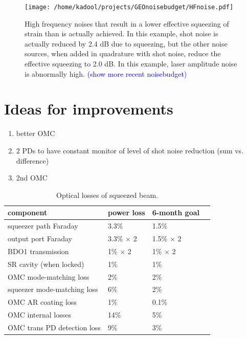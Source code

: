 \documentclass{ligodoc}
\begin{document}
\begin{figure}
\begin{centering}
\texttt{[image: /home/kadool/projects/GEOnoisebudget/HFnoise.pdf]}
\caption{High frequency noises that result in a lower effective
  squeezing of strain than is actually achieved. In this example, shot
  noise is actually reduced by 2.4 dB due to squeezing, but the other
  noise sources, when added in quadrature with shot noise, reduce the
  effective squeezing to 2.0 dB. In this example, laser amplitude
  noise is abnormally high. \textcolor{blue}{(show more recent
    noisebudget)}}
\label{fig:HFnoises}
\end{centering}
\end{figure}


\section{Ideas for improvements}
\label{sec:future}

\begin{enumerate}
\item better OMC
\item 2 PDs to have constant monitor of level of shot noise reduction
  (sum vs. difference)
\item 2nd OMC
\end{enumerate}



\begin{table}
\centering
\caption{Optical losses of squeezed beam.}
\begin{tabular}{l l l l} %
\hline
component & power loss & 6-month goal \\
\hline
squeezer path Faraday & 3.3\% & 1.5\% \\
output port Faraday & 3.3\% $\times$ 2 & 1.5\% $\times$ 2 \\
BDO1 transmission & 1\% $\times$ 2 & 1\% $\times$ 2 \\
SR cavity (when locked) & 1\% & 1\% \\
OMC mode-matching loss & 2\% & 2\% \\
squeezer mode-matching loss & 6\% & 2\% \\
OMC AR coating loss & 1\% & 0.1\% \\
OMC internal losses & 14\% & 5\% \\
OMC trans PD detection loss & 9\% & 3\% \\
\hline
\end{tabular}
\label{tab:losses_goal}
\end{table}
\end{document}
